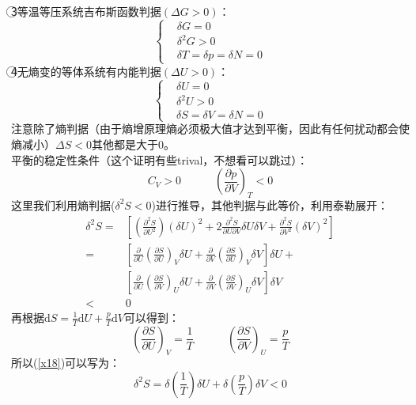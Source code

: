 \documentclass[12pt]{article}
\begin{document}
\textcircled{3}等温等压系统吉布斯函数判据$(\Delta G>0)$：
\begin{equation}
	\left \{\begin{split}
		&\delta G=0\\
		&\delta^2G>0\\
		&\delta T=\delta p=\delta N=0 
	\end{split}
\right.
\end{equation}
\textcircled{4}无熵变的等体系统有内能判据$(\Delta U>0)$：
\begin{equation}
	\left \{\begin{split}
		&\delta U=0\\
		&\delta^2U>0\\
		&\delta S=\delta V=\delta N=0
	\end{split}
\right.
\end{equation}
注意除了熵判据（由于熵增原理熵必须极大值才达到平衡，因此有任何扰动都会使熵减小）$\Delta S<0$其他都是大于0。\\
平衡的稳定性条件（这个证明有些trival，不想看可以跳过）：
\begin{equation}
	C_V>0\quad \quad \quad (\frac{\partial p}{\partial V})_T<0
	\label{x21}
\end{equation}
这里我们利用熵判据($\delta^2S<0$)进行推导，其他判据与此等价，利用泰勒展开：
\begin{equation}
	\begin{split}
	\delta^2 S=&[(\frac{\partial^2 S}{\partial U^2})(\delta U)^2+2\frac{\partial^2 S}{\partial U\partial V}\delta U\delta V+\frac{\partial^2 S}{\partial V^2}(\delta V)^2]\\
	=&[\frac{\partial}{\partial U}(\frac{\partial S}{\partial U})_V\delta U+\frac{\partial}{\partial V}(\frac{\partial S}{\partial U})_V\delta V]\delta U+\\
	&[\frac{\partial }{\partial U}(\frac{\partial S}{\partial V})_U\delta U+\frac{\partial}{\partial V}(\frac{\partial S}{\partial V})_U\delta V]\delta V\\
	<&0
	\end{split}
\label{x18}
\end{equation}
再根据$\mathrm{d}S=\frac{1}{T}\mathrm{d}U+\frac{p}{T}\mathrm{d}V$可以得到：
\begin{equation}
	(\frac{\partial S}{\partial U})_V=\frac{1}{T}\quad \quad \quad (\frac{\partial S}{\partial V})_U=\frac{p}{T}
\end{equation}
所以(\ref{x18})可以写为：
\begin{equation}
	\delta^2S=\delta(\frac{1}{T})\delta U+\delta(\frac{p}{T})\delta V<0
	\label{x20}
\end{equation}
\end{document}
